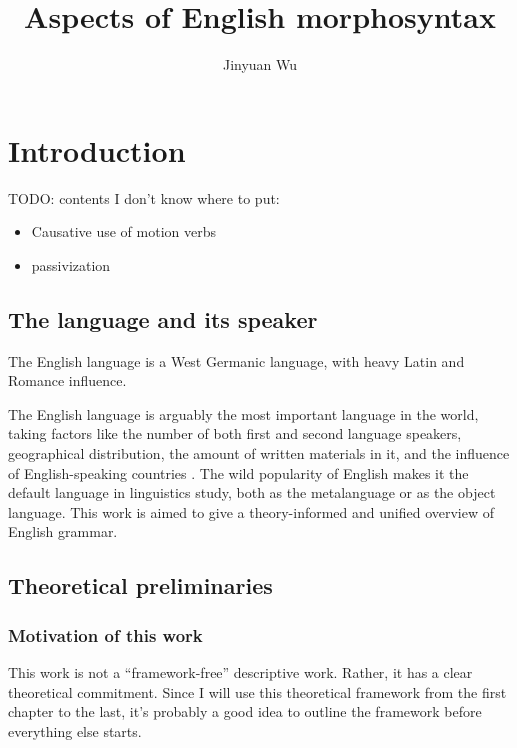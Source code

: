 \documentclass[UTF8, a4paper, oneside, scheme=plain]{ctexrep}
\title{Aspects of English morphosyntax}
\author{Jinyuan Wu}
\newcommand*{\citepage}[1]{p.~{#1}}
\begin{document}
    
\maketitle

\automath

\tableofcontents

\chapter{Introduction}

\setcounter{page}{1}

TODO: contents I don't know where to put:
\begin{itemize}
    \item Causative use of motion verbs \citep[\citepage{103}]{dixon2005semantic}
    \item passivization
\end{itemize}

\section{The language and its speaker}

The English language is a West Germanic language,
with heavy Latin and Romance influence. 

The English language is arguably the most important language in the world,
taking factors like the number of both first and second language speakers,
geographical distribution,
the amount of written materials in it,
and the influence of English-speaking countries \citep[\citepage{3}]{quirk1985}.
The wild popularity of English 
makes it the default language in linguistics study,
both as the metalanguage or as the object language.
This work is aimed to give a theory-informed and unified overview of English grammar.


\section{Theoretical preliminaries}

\subsection{Motivation of this work}

This work is not a ``framework-free'' descriptive work.
Rather, it has a clear theoretical commitment.
Since I will use this theoretical framework from the first chapter to the last,
it's probably a good idea to outline the framework before everything else starts.
\end{document}
